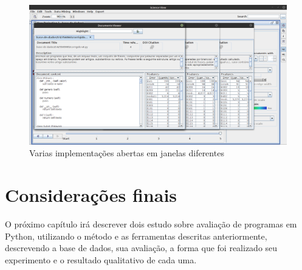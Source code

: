 		\begin{figure}
			\centering
			\includegraphics[width=0.7\linewidth]{imagem/ladoAlado}
			\caption{Varias implementações abertas em janelas diferentes}
			\label{fig:ladoAlado}
		\end{figure}
		

	\section{Considerações finais}
	
		O próximo capítulo %
		irá descrever dois estudo sobre avaliação de programas em Python,
		utilizando o método e as ferramentas descritas anteriormente,
		descrevendo a base de dados, sua avaliação, a forma que foi realizado
		seu experimento e o resultado qualitativo de cada uma.
